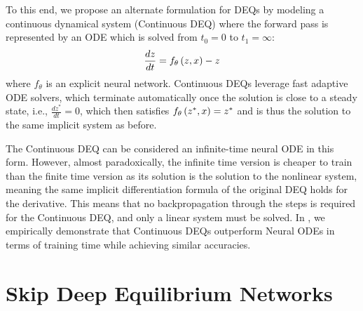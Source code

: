 To this end, we propose an alternate formulation for DEQs by modeling a continuous dynamical system (Continuous DEQ) where the forward pass is represented by an ODE which is solved from $t_0 = 0$ to $t_1 = \infty$:
%
\begin{equation}
    \frac{dz}{dt} = f_\theta\left(z, x\right) - z
\end{equation}
%
where $f_\theta$ is an explicit neural network. Continuous DEQs leverage fast adaptive ODE solvers, which terminate automatically once the solution is close to a steady state, i.e., $\frac{dz^*}{dt} = 0$, which then satisfies $f_\theta\left(z^*, x\right) = z^*$ and is thus the solution to the same implicit system as before.

The Continuous DEQ can be considered an infinite-time neural ODE in this form. However, almost paradoxically, the infinite time version is cheaper to train than the finite time version as its solution is the solution to the nonlinear system, meaning the same implicit differentiation formula of the original DEQ holds for the derivative. This means that no backpropagation through the steps is required for the Continuous DEQ, and only a linear system must be solved. In , we empirically demonstrate that Continuous DEQs outperform Neural ODEs in terms of training time while achieving similar accuracies.


\section{Skip Deep Equilibrium Networks}
\label{sec:skip_deqs}

